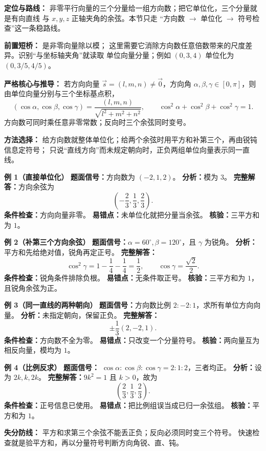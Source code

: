 \begin{knowledgeBox}
\textbf{定位与路线：}
非零平行向量的三个分量给一组方向数；把它单位化，三个分量就是有向直线
与 \(x,y,z\) 正轴夹角的余弦。本节只走
“方向数 \(\to\) 单位化 \(\to\) 符号检查”这一条稳路线。

\textbf{前置短桥：}
是非零向量除以模；
这里需要它消除方向数任意倍数带来的尺度差异。识别“与坐标轴夹角”就读取
单位向量分量；例如 \((0,3,4)\) 单位化为 \((0,3/5,4/5)\)。

\textbf{严格核心与推导：}
若方向向量 \(\vec s=(l,m,n)\ne\vec0\)，方向角
\(\alpha,\beta,\gamma\in[0,\pi]\)，则由单位向量分别与三个坐标基点积，
\[
(\cos\alpha,\cos\beta,\cos\gamma)
=\frac{(l,m,n)}{\sqrt{l^2+m^2+n^2}},\qquad
\cos^2\alpha+\cos^2\beta+\cos^2\gamma=1.
\]
方向数可同时乘任意非零常数；反向时三个余弦同时变号。

\textbf{方法选择：}
给方向数就整体单位化；给两个余弦时用平方和补第三个，再由锐钝信息定符号；
只说“直线方向”而未规定朝向时，正负两组单位向量表示同一直线。

\textbf{例 1（直接单位化）}
\textbf{题面信号：}方向数为 \((-2,1,2)\)。
\textbf{分析：}模为 \(3\)。
\textbf{完整解答：}方向余弦为
\[
\left(-\frac23,\frac13,\frac23\right).
\]
\textbf{条件检查：}方向向量非零。
\textbf{易错点：}未单位化就把分量当余弦。
\textbf{核验：}三平方和为 \(1\)。

\textbf{例 2（补第三个方向余弦）}
\textbf{题面信号：}\(\alpha=60^\circ,\beta=120^\circ\)，且
\(\gamma\) 为锐角。
\textbf{分析：}平方和先给绝对值，锐角再定正号。
\textbf{完整解答：}
\[
\cos^2\gamma=1-\frac14-\frac14=\frac12,\qquad
\cos\gamma=\frac{\sqrt2}{2}.
\]
\textbf{条件检查：}锐角条件排除负根。
\textbf{易错点：}无条件取正号。
\textbf{核验：}三平方和为 \(1\)，且锐角余弦为正。

\textbf{例 3（同一直线的两种朝向）}
\textbf{题面信号：}方向数比例 \(2:-2:1\)，求所有单位方向向量。
\textbf{分析：}未指定朝向，保留正负。
\textbf{完整解答：}
\[
\pm\frac13(2,-2,1).
\]
\textbf{条件检查：}方向数不全为零。
\textbf{易错点：}只改变一个分量符号。
\textbf{核验：}两向量互为相反向量，模均为 \(1\)。

\textbf{例 4（比例反求）}
\textbf{题面信号：}
\(\cos\alpha:\cos\beta:\cos\gamma=2:1:2\)，三者均正。
\textbf{分析：}设为 \(2k,k,2k\)。
\textbf{完整解答：}\(9k^2=1\) 且 \(k>0\)，故为
\[
\left(\frac23,\frac13,\frac23\right).
\]
\textbf{条件检查：}正号信息已使用。
\textbf{易错点：}把比例组误当成已归一余弦组。
\textbf{核验：}平方和为 \(1\)。

\textbf{失分防线：}
平方和求第三个余弦不能丢正负；反向必须同时变三个符号。
快速检查就是验平方和，再以分量符号判断方向角锐、直、钝。


\end{knowledgeBox}
